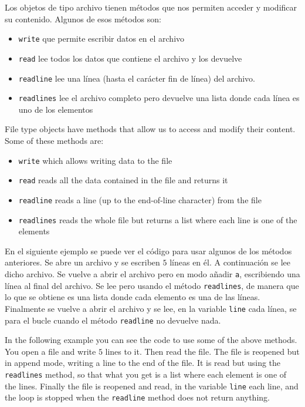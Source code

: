 \begin{paracol}{2}
    \switchcolumn
    Los objetos de tipo archivo tienen métodos que nos permiten acceder y modificar su contenido. Algunos de esos métodos son:  
    \begin{itemize}
        \item \texttt{write} que permite escribir datos en el archivo
        \item \texttt{read} lee todos los datos que contiene el archivo y los devuelve
        \item \texttt{readline} lee una línea (hasta el carácter fin de línea) del archivo. 
        \item \texttt{readlines} lee el archivo completo pero devuelve una lista donde cada línea es uno de los elementos
    \end{itemize}
    \switchcolumn
    File type objects have methods that allow us to access and modify their content. Some of these methods are:  
    \begin{itemize}
        \item \texttt{write} which allows writing data to the file
        \item \texttt{read} reads all the data contained in the file and returns it
        \item \texttt{readline} reads a line (up to the end-of-line character) from the file
        \item \texttt{readlines} reads the whole file but returns a list where each line is one of the elements
    \end{itemize}
    \switchcolumn
    En el siguiente ejemplo se puede ver el código para usar algunos de los métodos anteriores. Se abre un archivo y se escriben $5$ líneas en él. A continuación se lee dicho archivo. Se vuelve a abrir el archivo pero en modo añadir \texttt{a}, escribiendo una línea al final del archivo. Se lee pero usando el método \texttt{readlines}, de manera que lo que se obtiene es una lista donde cada elemento es una de las líneas. Finalmente se vuelve a abrir el archivo y se lee, en la variable \texttt{line} cada línea, se para el bucle cuando el método \texttt{readline} no devuelve nada.

    \switchcolumn
        In the following example you can see the code to use some of the above methods. You open a file and write $5$ lines to it. Then read the file. The file is reopened but in append mode, writing a line to the end of the file. It is read but using the \texttt{readlines} method, so that what you get is a list where each element is one of the lines. Finally the file is reopened and read, in the variable \texttt{line} each line, and the loop is stopped when the \texttt{readline} method does not return anything.
\end{paracol}

